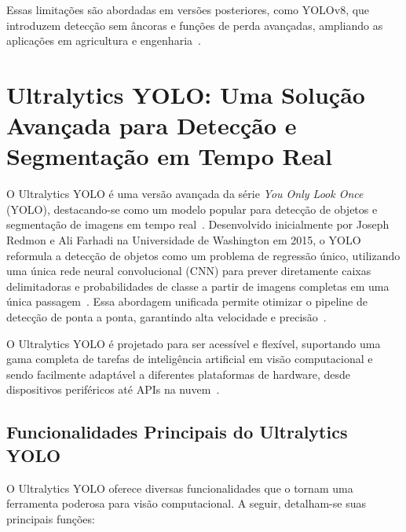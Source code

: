 \documentclass[journal,transmag]{IEEEtran}
\begin{document}
Essas limitações são abordadas em versões posteriores, como YOLOv8, que introduzem detecção sem âncoras e funções de perda avançadas, ampliando as aplicações em agricultura e engenharia~\cite{Redmon2015}.

\section{Ultralytics YOLO: Uma Solução Avançada para Detecção e Segmentação em Tempo Real}

O Ultralytics YOLO é uma versão avançada da série \textit{You Only Look Once} (YOLO), destacando-se como um modelo popular para detecção de objetos e segmentação de imagens em tempo real~\cite{Redmon2015}. Desenvolvido inicialmente por Joseph Redmon e Ali Farhadi na Universidade de Washington em 2015, o YOLO reformula a detecção de objetos como um problema de regressão único, utilizando uma única rede neural convolucional (CNN) para prever diretamente caixas delimitadoras e probabilidades de classe a partir de imagens completas em uma única passagem~\cite{Redmon2015}. Essa abordagem unificada permite otimizar o pipeline de detecção de ponta a ponta, garantindo alta velocidade e precisão~\cite{Redmon2015}.

O Ultralytics YOLO é projetado para ser acessível e flexível, suportando uma gama completa de tarefas de inteligência artificial em visão computacional e sendo facilmente adaptável a diferentes plataformas de hardware, desde dispositivos periféricos até APIs na nuvem~\cite{Redmon2015}.

\subsection{Funcionalidades Principais do Ultralytics YOLO}

O Ultralytics YOLO oferece diversas funcionalidades que o tornam uma ferramenta poderosa para visão computacional. A seguir, detalham-se suas principais funções:
\end{document}
